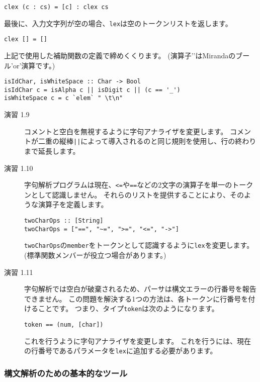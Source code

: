 \documentclass{jarticle}
\begin{document}
\begin{verbatim}
clex (c : cs) = [c] : clex cs
\end{verbatim}

最後に、入力文字列が空の場合、\texttt{lex}は空のトークンリストを返します。

\begin{verbatim}
clex [] = []
\end{verbatim}

上記で使用した補助関数の定義で締めくくります。
(演算子'\texttt{\/}'はMirandaのブール'or'演算です。)

\begin{verbatim}
isIdChar, isWhiteSpace :: Char -> Bool
isIdChar c = isAlpha c || isDigit c || (c == '_')
isWhiteSpace c = c `elem` " \t\n"
\end{verbatim}

\begin{description}
	\item[演習 1.9] コメントと空白を無視するように字句アナライザを変更します。
	      コメントが二重の縦棒\texttt{||}によって導入されるのと同じ規則を使用し、行の終わりまで延長します。
	\item[演習 1.10] 字句解析プログラムは現在、\texttt{<=}や\texttt{==}などの2文字の演算子を単一のトークンとして認識しません。
	      それらのリストを提供することにより、そのような演算子を定義します。

	      \begin{verbatim}
twoCharOps :: [String]
twoCharOps = ["==", "~=", ">=", "<=", "->"]
\end{verbatim}

	      \texttt{twoCharOps}の\texttt{member}をトークンとして認識するように\texttt{lex}を変更します。
	      (標準関数メンバーが役立つ場合があります。)
	\item[演習 1.11] 字句解析では空白が破棄されるため、パーサは構文エラーの行番号を報告できません。
	      この問題を解決する1つの方法は、各トークンに行番号を付けることです。
	      つまり、タイプ\texttt{token}は次のようになります。

	      \begin{verbatim}
token == (num, [char])
\end{verbatim}

	      これを行うように字句アナライザを変更します。
	      これを行うには、現在の行番号であるパラメータを\texttt{lex}に追加する必要があります。
\end{description}

\subsubsection{構文解析のための基本的なツール}
\end{document}
